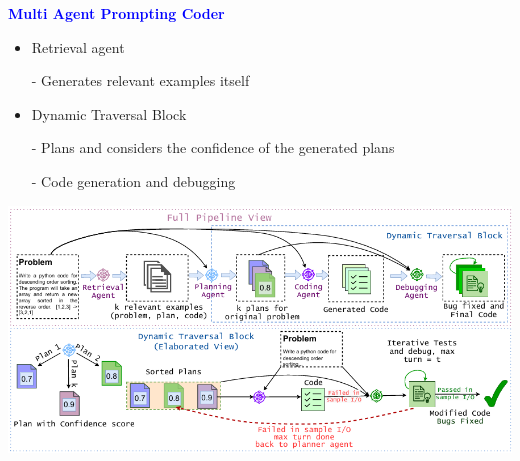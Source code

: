 \documentclass[professionalfont]{beamer}
\begin{document}
\begin{frame}
\begin{center}
    { \textbf{\textcolor{blue}{ {\fontsize{12}{14}\selectfont Multi Agent Prompting Coder} }} }
\end{center}

{\fontsize{10}{14}\selectfont 
\begin{itemize}
    \item Retrieval agent
    
    - Generates relevant examples itself
\end{itemize}

\begin{itemize}
    \item Dynamic Traversal Block
    
    - Plans and considers the confidence of the generated plans
    
    - Code generation and debugging
\end{itemize}
}

\begin{center}
    \includegraphics[width=1.0\textwidth]{figure1.png}
\end{center}

\end{frame}
\end{document}
